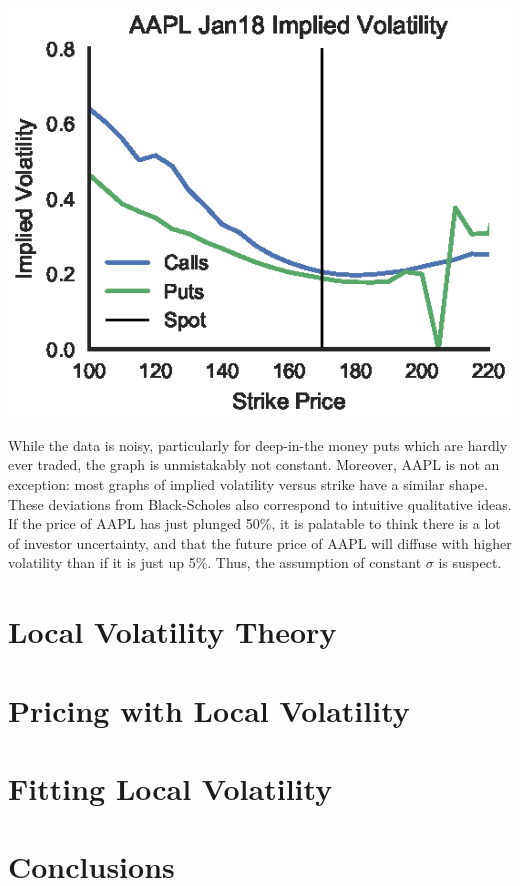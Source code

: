 \documentclass[twocolumn]{article}
\begin{document}
\begin{center}
\includegraphics{figs/aapliv}
\end{center}

While the data is noisy, particularly for deep-in-the money puts
which are hardly ever traded, the graph is unmistakably not constant. Moreover,
AAPL is not an exception: most graphs of implied volatility versus strike have a
similar shape. These deviations from Black-Scholes also correspond to
intuitive qualitative ideas. If the price of AAPL has just plunged 50\%, it is
palatable to think there is a lot of investor uncertainty, and that the future
price of AAPL will diffuse with higher volatility than if it is just up 5\%.
Thus, the assumption of constant $\sigma$ is suspect.

\section{Local Volatility Theory}

\section{Pricing with Local Volatility}

\section{Fitting Local Volatility}

\section{Conclusions}
\end{document}
